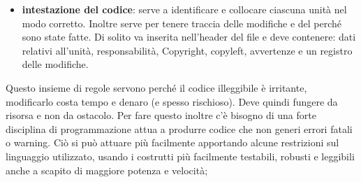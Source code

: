 \begin{itemize}
\begin{itemize}
				\item \textbf{intestazione del codice}: serve a identificare e collocare ciascuna unità nel modo corretto. Inoltre serve per tenere traccia delle modifiche e del perché sono state fatte. Di solito va inserita nell'header del file e deve contenere: dati relativi all'unità, responsabilità, Copyright, copyleft, avvertenze e un registro delle modifiche.
			\end{itemize}
			\noindent
		Questo insieme di regole servono perché il codice illeggibile è irritante, modificarlo costa tempo e denaro (e spesso rischioso). Deve quindi fungere da risorsa e non da ostacolo. \newline
		Per fare questo inoltre c'è bisogno di una forte disciplina di programmazione attua a produrre codice che non generi errori fatali o warning. Ciò si può attuare più facilmente apportando alcune restrizioni sul linguaggio utilizzato, usando i costrutti più facilmente testabili, robusti e leggibili anche a scapito di maggiore potenza e velocità;


	\end{itemize}
